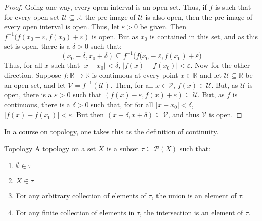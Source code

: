 \documentclass[crop=false,class=book,oneside]{standalone}
\begin{document}
            \begin{proof}
                Going one way, every open interval is an open set.
                Thus, if $f$ is such that for every open set
                $\mathcal{U}\subseteq\mathbb{R}$, the pre-image of
                $\mathcal{U}$ is also open, then the pre-image of every
                open interval is open. Thus, let $\varepsilon>0$ be
                given. Then
                $f^{-1}(f(x_{0}-\varepsilon,f(x_{0})+\varepsilon)$ is
                open. But as $x_{0}$ is contained in this set, and as
                this set is open, there is a $\delta>0$ such that:
                \begin{equation}
                    (x_{0}-\delta,x_{0}+\delta)\subseteq
                    f^{-1}\big(
                        f(x_{0}-\varepsilon,f(x_{0})+\varepsilon\big)
                \end{equation}
                Thus, for all $x$ such that
                $|x-x_{0}|<\delta$, $|f(x)-f(x_{0})|<\varepsilon$.
                Now for the other direction. Suppose
                $f:\mathbb{R}\rightarrow\mathbb{R}$ is continuous at
                every point $x\in\mathbb{R}$ and let
                $\mathcal{U}\subseteq\mathbb{R}$ be an open set, and
                let $\mathcal{V}=f^{-1}(\mathcal{U})$. Then, for all
                $x\in\mathcal{V}$, $f(x)\in\mathcal{U}$. But, as
                $\mathcal{U}$ is open, there is a $\varepsilon>0$
                such that
                $(f(x)-\varepsilon,f(x)+\varepsilon)\subseteq\mathcal{U}$.
                But, as $f$ is continuous, there is a $\delta>0$ such
                that, for for all $|x-x_{0}|<\delta$,
                $|f(x)-f(x_{0})|<\varepsilon$. But then
                $(x-\delta,x+\delta)\subseteq\mathcal{V}$, and thus
                $\mathcal{V}$ is open.
            \end{proof}
            In a course on topology, one takes this as the definition of
            continuity.
            \newpage
            \begin{ldefinition}{Topology}
                A topology on a set $X$ is a subset
                $\tau\subseteq\mathcal{P}(X)$ such that:
                \begin{enumerate}
                    \item $\emptyset\in\tau$
                    \item $X\in\tau$
                    \item For any arbitrary collection of elements of
                          $\tau$, the union is an element of $\tau$.
                    \item For any finite collection of elements in
                          $\tau$, the intersection is an element of
                          $\tau$.
                \end{enumerate}
            \end{ldefinition}
\end{document}
